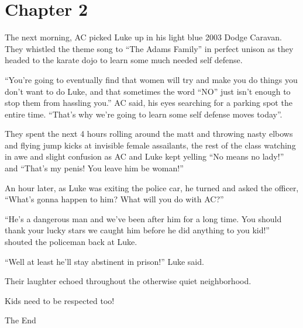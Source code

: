 \section*{Chapter 2}

The next morning, AC picked Luke up in his light blue 2003 Dodge
Caravan. They whistled the theme song to ``The Adams
Family'' in perfect unison as they headed to the karate dojo
to learn some much needed self defense.



``You're going to eventually find that women will try
and make you do things you don't want to do Luke, and that
sometimes the word ``NO'' just isn't enough to stop
them from hassling you.'' AC said, his eyes searching for a
parking spot the entire time. ``That's why we're
going to learn some self defense moves today''.



They spent the next 4 hours rolling around the matt and throwing
nasty elbows and flying jump kicks at invisible female assailants,
the rest of the class watching in awe and slight confusion as AC
and Luke kept yelling ``No means no lady!'' and
``That's my penis! You leave him be woman!''



An hour later, as Luke was exiting the police car, he turned and
asked the officer, ``What's gonna happen to him? What
will you do with AC?''



``He's a dangerous man and we've been after him for a long
time. You should thank your lucky stars we caught him before he did
anything to you kid!'' shouted the policeman back at
Luke.



``Well at least he'll stay abstinent in prison!''
Luke said.



Their laughter echoed throughout the otherwise quiet
neighborhood.



Kids need to be respected too!

The End
 



